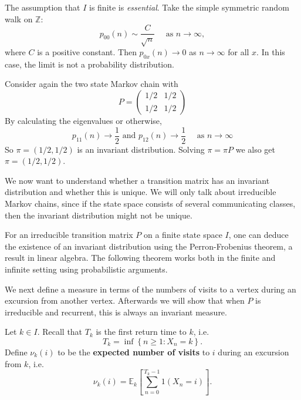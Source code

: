 \documentclass[a4paper]{article}
\begin{document}
\begin{remark}
    The assumption that $I$ is finite is \textit{essential}. Take the simple symmetric random walk on $\mathbb{Z}$:
    \[
    p_{00}(n) \sim \frac{C}{\sqrt{n}} \quad \text { as } n \rightarrow \infty,
    \]
    where $C$ is a positive constant. Then $p_{0 x}(n) \rightarrow 0$ as $n \rightarrow \infty$ for all $x$. In this case, the limit is not a probability distribution.
\end{remark}

\begin{example}
    Consider again the two state Markov chain with
    \[
    P=
    \begin{pmatrix}
        1 / 2 & 1 / 2 \\
    1 / 2 & 1 / 2
    \end{pmatrix}
    \]
    By calculating the eigenvalues or otherwise,
    \[
    p_{11}(n) \rightarrow \frac{1}{2} \text { and } p_{12}(n) \rightarrow \frac{1}{2} \quad \text { as } n \rightarrow \infty
    \]
    So $\pi=(1 / 2,1 / 2)$ is an invariant distribution. Solving $\pi=\pi P$ we also get $\pi=(1 / 2,1 / 2)$.
\end{example}

We now want to understand whether a transition matrix has an invariant distribution and whether this is unique. We will only talk about irreducible Markov chains, since if the state space consists of several communicating classes, then the invariant distribution might not be unique.

\begin{remark}
    For an irreducible transition matrix $P$ on a finite state space $I$, one can deduce the existence of an invariant distribution using the Perron-Frobenius theorem, a result in linear algebra. The following theorem works both in the finite and infinite setting using probabilistic arguments.
\end{remark}

We next define a measure in terms of the numbers of visits to a vertex during an excursion from another vertex. Afterwards we will show that when $P$ is irreducible and recurrent, this is always an invariant measure.

\begin{definition}
    Let $k \in I$. Recall that $T_k$ is the first return time to $k$, i.e.
    \[
    T_k=\inf \left\{n \geq 1: X_n=k\right\} .
    \]
    Define $\nu_k(i)$ to be the \textbf{expected number of visits} to $i$ during an excursion from $k$, i.e.
    \[
    \nu_k(i)=\mathbb{E}_k\left[\sum_{n=0}^{T_k-1} 1\left(X_n=i\right)\right] .
    \]
\end{definition}
\end{document}
